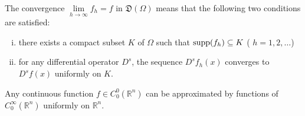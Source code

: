 \begin{corollaryu} The convergence $\lim\limits_{h\to \infty}f_h = f$ in $\mathfrak{D}(\Omega)$ means that the following two conditions are satisfied: \begin{enumerate}[(i)]
\item there exists a compact subset $K$ of $\Omega$ such that $\operatorname{supp}(f_h)\subseteq K$ ( $h = 1,2,\ldots$)
\item for any differential operator $D^{s}$, the sequence $D^{s}f_{h}(x)$ converges to $D^{s}f(x)$ uniformly on $K$.
\end{enumerate}
\end{corollaryu}

\begin{proposition}\label{prop:I.1.Proposition.8} Any continuous function $f \in C_0^0(\mathbb{R}^{n})$ can be approximated by functions of $C_0^\infty(\mathbb{R}^{n})$ uniformly on $\mathbb{R}^{n}$. 
\end{proposition}

